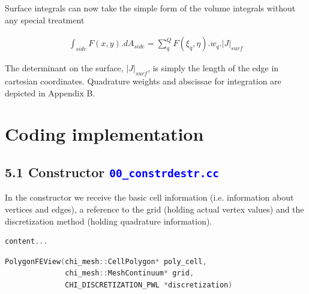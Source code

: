 \documentclass[11pt,letterpaper,titlepage]{article}
\newcommand{\beqn}{\begin{equation}
	\begin{aligned}}
\newcommand{\eeqn}{\end{aligned}
	\end{equation}}
\newcommand{\xmltag}[1]{\textcolor{blue}{ \texttt{#1}} }
\begin{document}
Surface integrals can now take the simple form of the volume integrals without any special treatment

\beqn 
\int_{side} F(x,y).dA_{side} = \sum_q^Q F(\xi_q,\eta).w_q.|J|_{surf}
\eeqn 

The determinant on the surface, $|J|_{surf}$, is simply the length of the edge in cartesian coordinates. Quadrature weights and abscissae for integration are depicted in Appendix B.


\section{Coding implementation}
\subsection{5.1 Constructor \xmltag{00\_constrdestr.cc}}
In the constructor we receive the basic cell information (i.e. information about vertices and edges), a reference to the grid (holding actual vertex values) and the discretization method (holding quadrature information).
\begin{lstlisting}[language=c++]
content...
\end{lstlisting}
\begin{lstlisting}[language=c++]
PolygonFEView(chi_mesh::CellPolygon* poly_cell,
              chi_mesh::MeshContinuum* grid,
              CHI_DISCRETIZATION_PWL *discretization)
\end{lstlisting}
\end{document}
